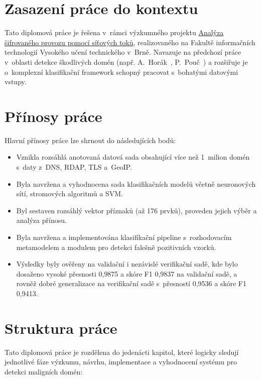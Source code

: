 \section{Zasazení práce do kontextu}
Tato diplomová práce je řešena v~rámci výzkumného projektu \href{https://www.fit.vut.cz/research/project/1530/.cs}{Analýza šifrovaného provozu pomocí síťových toků}, realizovaného na Fakultě informačních technologií Vysokého učení technického v~Brně. Navazuje na předchozí práce v~oblasti detekce škodlivých domén (např. A.~Horák~\cite{ovi}, P.~Pouč~\cite{petr}) a rozšiřuje je o~komplexní klasifikační framework schopný pracovat s~bohatými datovými vstupy.

\section{Přínosy práce}
Hlavní přínosy práce lze shrnout do následujících bodů:
\begin{itemize}
    \item Vznikla rozsáhlá anotovaná datová sada obsahující více než 1~milion domén s~daty z~DNS, RDAP, TLS a~GeoIP.
    \item Byla navržena a vyhodnocena sada klasifikačních modelů včetně neuronových sítí, stromových algoritmů a SVM.
    \item Byl sestaven rozsáhlý vektor příznaků (až 176 prvků), proveden jejich výběr a analýza přínosu.
    \item Byla navržena a implementována klasifikační pipeline s~rozhodovacím metamodelem a modulem pro detekci falešně pozitivních vzorků.
    \item Výsledky byly ověřeny na validační i nezávislé verifikační sadě, kde bylo dosaženo vysoké přesnosti 0{,}9875 a skóre F1 0{,}9837 na validační sadě, a rovněž dobré generalizace na verifikační sadě s~přesností 0{,}9536 a skóre F1 0{,}9413.
\end{itemize}
\section{Struktura práce}
Tato diplomová práce je rozdělena do jedenácti kapitol, které logicky sledují jednotlivé fáze výzkumu, návrhu, implementace a vyhodnocení systému pro detekci maligních domén:

